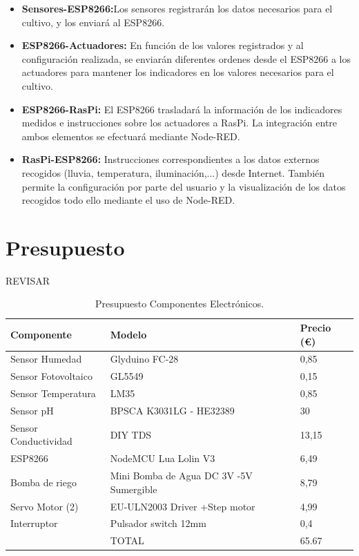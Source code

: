\documentclass[12pt,a4paper,titlepage,oneside]{report}
\begin{document}
		\begin{itemize}
			\item \textbf{Sensores-ESP8266:}Los sensores registrarán los datos necesarios para el cultivo, y los enviará al ESP8266.
			\item \textbf{ESP8266-Actuadores:} En función de los valores registrados y al configuración realizada, se enviarán diferentes ordenes desde el ESP8266 a los actuadores para mantener los indicadores en los valores necesarios para el cultivo.
			\item \textbf{ESP8266-RasPi:} El ESP8266 trasladará la información de los indicadores medidos e instrucciones sobre los actuadores a RasPi. La integración entre ambos elementos se efectuará mediante Node-RED.
			\item \textbf{RasPi-ESP8266:} Instrucciones correspondientes a los datos externos recogidos (lluvia, temperatura, iluminación,...) desde Internet. También permite la configuración por parte del usuario y la visualización de los datos recogidos todo ello mediante el uso de Node-RED.
			
		\end{itemize}




\newpage
\section{Presupuesto}

REVISAR

\begin{table}[htbp]
\begin{center}
\begin{tabular}{|l||l|l|}
\hline
Componente & Modelo & Precio (€) \\ \hline \hline
Sensor Humedad &	Glyduino FC-28 &	0,85  \\ \hline
Sensor Fotovoltaico &  GL5549 & 0,15 \\ \hline
Sensor Temperatura & LM35 & 0,85 \\ \hline
Sensor pH & BPSCA K3031LG - HE32389 & 30 \\ \hline
Sensor Conductividad & DIY TDS & 13,15 \\ \hline
ESP8266 & NodeMCU Lua Lolin V3 & 6,49 \\ \hline
Bomba de riego & Mini Bomba de Agua DC 3V -5V Sumergible & 8,79 \\ \hline
Servo Motor (2) & EU-ULN2003 Driver +Step motor & 4,99 \\ \hline
Interruptor & Pulsador switch 12mm & 0,4 \\ \hline
  & TOTAL & 65.67 \\ \hline



\end{tabular}
\caption{Presupuesto Componentes Electrónicos.}
\label{tabla:sencilla}
\end{center}
\end{table}
\end{document}

